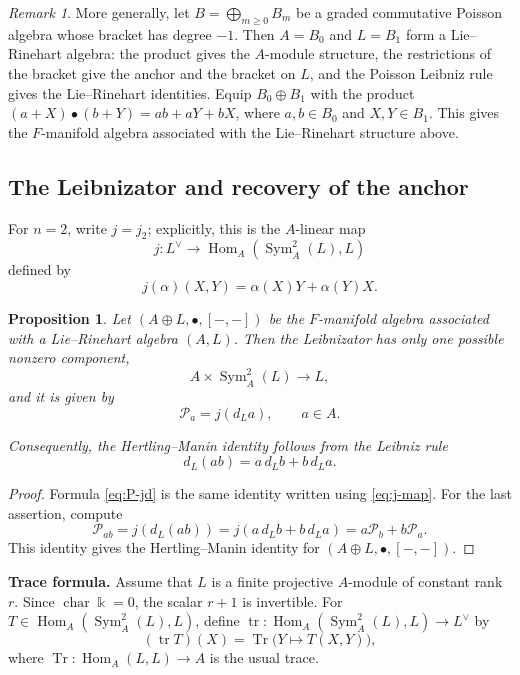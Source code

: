 \documentclass[12pt,reqno]{amsart}
\newtheorem{proposition}[theorem]{Proposition}
\theoremstyle{definition}
\theoremstyle{remark}
\newtheorem{remark}[theorem]{Remark}
\newcommand{\kk}{\Bbbk}
\newcommand{\Sym}{\operatorname{Sym}}
\newcommand{\tr}{\operatorname{tr}}
\newcommand{\Pcal}{\mathcal P}
\begin{document}
	\begin{remark}\label{rem:graded-poisson}
		More generally, let $B=\bigoplus_{m\geq0}B_m$ be a graded commutative Poisson
		algebra whose bracket has degree $-1$.  Then $A=B_0$ and $L=B_1$ form a
		Lie--Rinehart algebra: the product gives the $A$-module structure, the
		restrictions of the bracket give the anchor and the bracket on $L$, and the
		Poisson Leibniz rule gives the Lie--Rinehart identities.  Equip $B_0\oplus B_1$
		with the product $(a+X)\bullet(b+Y)=ab+aY+bX$, where $a,b\in B_0$ and
		$X,Y\in B_1$.  This gives the $F$-manifold algebra associated with the
		Lie--Rinehart structure above.
	\end{remark}
	
	\subsection{The Leibnizator and recovery of the anchor}
	
	For $n=2$, write $j=j_2$; explicitly, this is the $A$-linear map
	\[
	j:L^\vee\longrightarrow \operatorname{Hom}_A(\Sym_A^2(L),L)
	\]
	defined by
	\begin{equation}\label{eq:j-map}
		j(\alpha)(X,Y)=\alpha(X)Y+\alpha(Y)X.
	\end{equation}
	
	\begin{proposition}
		\label{prop:leibnizator-differential}
		Let $(A\oplus L,\bullet,[-,-])$ be the $F$-manifold algebra associated with a
		Lie--Rinehart algebra $(A,L)$.  Then the Leibnizator has only one possible
		nonzero component,
		\[
		A\times\Sym_A^2(L)\longrightarrow L,
		\]
		and it is given by
		\begin{equation}\label{eq:P-jd}
			\Pcal_a=j(d_La),\qquad a\in A.
		\end{equation}
		
		Consequently, the Hertling--Manin identity follows from the Leibniz rule
		\[
		d_L(ab)=a\,d_Lb+b\,d_La.
		\]
	\end{proposition}
	
	\begin{proof}
		
		Formula \eqref{eq:P-jd} is the same identity written using \eqref{eq:j-map}.
		For the last assertion, compute
		\[
		\Pcal_{ab}=j(d_L(ab))=j(a\,d_Lb+b\,d_La)=a\Pcal_b+b\Pcal_a.
		\]
		This identity gives the Hertling--Manin identity for
		$(A\oplus L,\bullet,[-,-])$.
	\end{proof}
	
	\medskip\noindent\textbf{Trace formula.}
	Assume that $L$ is a finite projective $A$-module of constant rank $r$.  Since
	$\operatorname{char}\kk=0$, the scalar $r+1$ is invertible.  For
	$T\in\operatorname{Hom}_A(\Sym_A^2(L),L)$, define
	$\tr:\operatorname{Hom}_A(\Sym_A^2(L),L)\to L^\vee$ by
	\[
	(\tr T)(X)=\operatorname{Tr}\bigl(Y\mapsto T(X,Y)\bigr),
	\]
	where $\operatorname{Tr}:\operatorname{Hom}_A(L,L)\to A$ is the usual trace.
	
\end{document}
